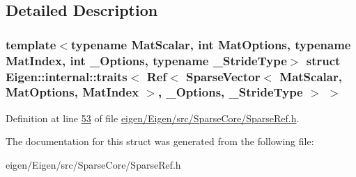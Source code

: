 \subsection{Detailed Description}
\subsubsection*{template$<$typename Mat\+Scalar, int Mat\+Options, typename Mat\+Index, int \+\_\+\+Options, typename \+\_\+\+Stride\+Type$>$\newline
struct Eigen\+::internal\+::traits$<$ Ref$<$ Sparse\+Vector$<$ Mat\+Scalar, Mat\+Options, Mat\+Index $>$, \+\_\+\+Options, \+\_\+\+Stride\+Type $>$ $>$}



Definition at line \hyperlink{eigen_2_eigen_2src_2_sparse_core_2_sparse_ref_8h_source_l00053}{53} of file \hyperlink{eigen_2_eigen_2src_2_sparse_core_2_sparse_ref_8h_source}{eigen/\+Eigen/src/\+Sparse\+Core/\+Sparse\+Ref.\+h}.



The documentation for this struct was generated from the following file\+:\begin{DoxyCompactItemize}
\item 
eigen/\+Eigen/src/\+Sparse\+Core/\+Sparse\+Ref.\+h\end{DoxyCompactItemize}
